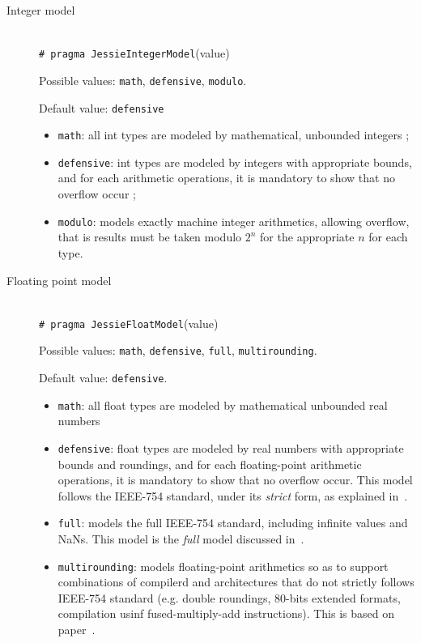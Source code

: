\documentclass[a4paper,11pt,twoside,openright]{report}
\begin{document}
\begin{description}
\item[Integer model]~\\

  \texttt{\# pragma JessieIntegerModel}(value)

  Possible values: \texttt{math}, \texttt{defensive}, \texttt{modulo}.

  Default value: \texttt{defensive}
  \begin{itemize}
  \item \texttt{math}: all int types are modeled by mathematical,
    unbounded integers ;
  \item \texttt{defensive}: int types are modeled by integers with
    appropriate bounds, and for each arithmetic operations, it is
    mandatory to show that no overflow occur ;
  \item \texttt{modulo}: models exactly machine integer arithmetics,
    allowing overflow, that is results must be taken modulo $2^n$ for
    the appropriate $n$ for each type.
  \end{itemize}

\item[Floating point model] ~\\

  \texttt{\# pragma JessieFloatModel}(value)

  Possible values: \texttt{math}, \texttt{defensive}, \texttt{full},
  \texttt{multirounding}.

  Default value: \texttt{defensive}.

  \begin{itemize}
  \item \texttt{math}: all float types are modeled by
    mathematical unbounded real numbers
  \item \texttt{defensive}: float types are modeled by real numbers
    with appropriate bounds and roundings, and for each floating-point
    arithmetic operations, it is mandatory to show that no overflow
    occur. This model follows the IEEE-754 standard, under its
    \emph{strict} form, as explained in~\cite{ayad09,ayad10ijcar}.
  \item \texttt{full}: models the full IEEE-754 standard, including
    infinite values and NaNs. This model is the \emph{full} model
    discussed in~\cite{ayad09,ayad10ijcar}.
  \item \texttt{multirounding}: models floating-point arithmetics so
    as to support combinations of compilerd and architectures that do
    not strictly follows IEEE-754 standard (e.g. double roundings,
    80-bits extended formats, compilation usinf fused-multiply-add
    instructions). This is based on paper~\cite{boldo09misc,boldo10-nfm}.


\end{itemize}
\end{description}
\end{document}
